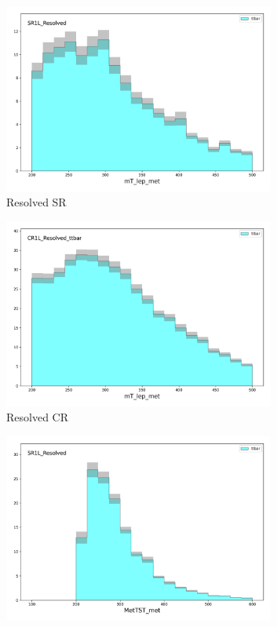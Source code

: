 \begin{figure}[htbp]
\begin{subfigure}{0.49\textwidth}
      \includegraphics[width = 0.98\textwidth]{Figures/4/CRSR/SR1L_Resolved/mT_lep_met.png}
      \caption{Resolved SR \mtlepmet}
      \end{subfigure}
      \begin{subfigure}{0.49\textwidth}
      \includegraphics[width = 0.98\textwidth]{Figures/4/CRSR/CR1L_Resolved_ttbar/mT_lep_met.png}
      \caption{Resolved CR \mtlepmet}
      \end{subfigure}
      \begin{subfigure}{0.49\textwidth}
      \includegraphics[width = 0.98\textwidth]{Figures/4/CRSR/SR1L_Resolved/MetTST_met.png}

\end{subfigure}
\end{figure}
